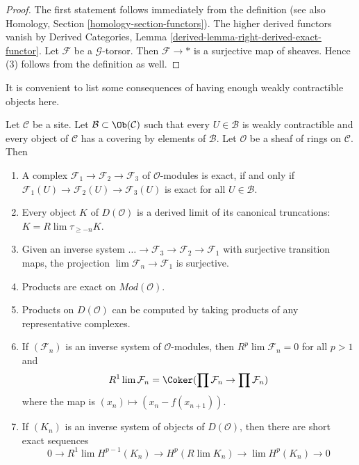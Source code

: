 \begin{proof}
The first statement follows immediately from the definition
(see also Homology, Section \ref{homology-section-functors}).
The higher derived functors vanish by
Derived Categories, Lemma \ref{derived-lemma-right-derived-exact-functor}.
Let $\mathcal{F}$ be a $\mathcal{G}$-torsor. Then $\mathcal{F} \to *$
is a surjective map of sheaves. Hence (3) follows from the
definition as well.
\end{proof}

\noindent
It is convenient to list some consequences of having enough
weakly contractible objects here.

\begin{proposition}
\label{proposition-enough-weakly-contractibles}
Let $\mathcal{C}$ be a site. Let $\mathcal{B} \subset \Ob(\mathcal{C})$
such that every $U \in \mathcal{B}$ is weakly contractible and
every object of $\mathcal{C}$ has a covering by elements of $\mathcal{B}$.
Let $\mathcal{O}$ be a sheaf of rings on $\mathcal{C}$. Then
\begin{enumerate}
\item A complex $\mathcal{F}_1 \to \mathcal{F}_2 \to \mathcal{F}_3$
of $\mathcal{O}$-modules is exact, if and only if
$\mathcal{F}_1(U) \to \mathcal{F}_2(U) \to \mathcal{F}_3(U)$
is exact for all $U \in \mathcal{B}$.
\item Every object $K$ of $D(\mathcal{O})$ is a derived limit
of its canonical truncations: $K = R\lim \tau_{\geq -n} K$.
\item Given an inverse system
$\ldots \to \mathcal{F}_3 \to \mathcal{F}_2 \to \mathcal{F}_1$
with surjective transition maps, the projection
$\lim \mathcal{F}_n \to \mathcal{F}_1$ is surjective.
\item Products are exact on $\textit{Mod}(\mathcal{O})$.
\item Products on $D(\mathcal{O})$ can be computed by taking
products of any representative complexes.
\item If $(\mathcal{F}_n)$ is an inverse system of $\mathcal{O}$-modules,
then $R^p\lim \mathcal{F}_n = 0$ for all $p > 1$ and
$$
R^1\lim \mathcal{F}_n  =
\Coker(\prod \mathcal{F}_n \to \prod \mathcal{F}_n)
$$
where the map is $(x_n) \mapsto (x_n - f(x_{n + 1}))$.
\item If $(K_n)$ is an inverse system of objects of $D(\mathcal{O})$,
then there are short exact sequences
$$
0 \to R^1\lim H^{p - 1}(K_n) \to H^p(R\lim K_n) \to
\lim H^p(K_n) \to 0
$$
\end{enumerate}
\end{proposition}

